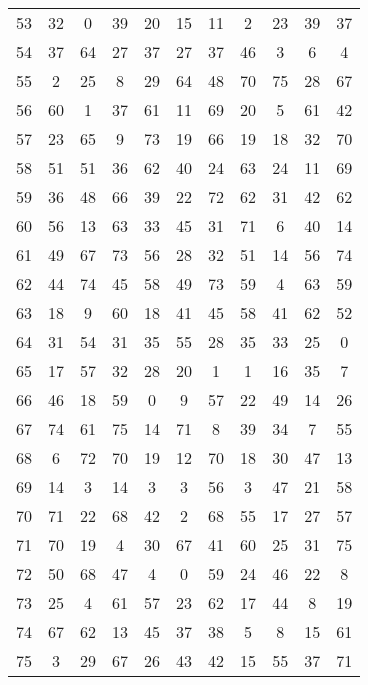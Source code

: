 \begin{table}
\begin{tabular}{c c c c c c c c c c c }
53 & 32 & 0 & 39 & 20 & 15 & 11 & 2 & 23 & 39 & 37 \\
54 & 37 & 64 & 27 & 37 & 27 & 37 & 46 & 3 & 6 & 4 \\
55 & 2 & 25 & 8 & 29 & 64 & 48 & 70 & 75 & 28 & 67 \\
56 & 60 & 1 & 37 & 61 & 11 & 69 & 20 & 5 & 61 & 42 \\
57 & 23 & 65 & 9 & 73 & 19 & 66 & 19 & 18 & 32 & 70 \\
58 & 51 & 51 & 36 & 62 & 40 & 24 & 63 & 24 & 11 & 69 \\
59 & 36 & 48 & 66 & 39 & 22 & 72 & 62 & 31 & 42 & 62 \\
60 & 56 & 13 & 63 & 33 & 45 & 31 & 71 & 6 & 40 & 14 \\
61 & 49 & 67 & 73 & 56 & 28 & 32 & 51 & 14 & 56 & 74 \\
62 & 44 & 74 & 45 & 58 & 49 & 73 & 59 & 4 & 63 & 59 \\
63 & 18 & 9 & 60 & 18 & 41 & 45 & 58 & 41 & 62 & 52 \\
64 & 31 & 54 & 31 & 35 & 55 & 28 & 35 & 33 & 25 & 0 \\
65 & 17 & 57 & 32 & 28 & 20 & 1 & 1 & 16 & 35 & 7 \\
66 & 46 & 18 & 59 & 0 & 9 & 57 & 22 & 49 & 14 & 26 \\
67 & 74 & 61 & 75 & 14 & 71 & 8 & 39 & 34 & 7 & 55 \\
68 & 6 & 72 & 70 & 19 & 12 & 70 & 18 & 30 & 47 & 13 \\
69 & 14 & 3 & 14 & 3 & 3 & 56 & 3 & 47 & 21 & 58 \\
70 & 71 & 22 & 68 & 42 & 2 & 68 & 55 & 17 & 27 & 57 \\
71 & 70 & 19 & 4 & 30 & 67 & 41 & 60 & 25 & 31 & 75 \\
72 & 50 & 68 & 47 & 4 & 0 & 59 & 24 & 46 & 22 & 8 \\
73 & 25 & 4 & 61 & 57 & 23 & 62 & 17 & 44 & 8 & 19 \\
74 & 67 & 62 & 13 & 45 & 37 & 38 & 5 & 8 & 15 & 61 \\
75 & 3 & 29 & 67 & 26 & 43 & 42 & 15 & 55 & 37 & 71 \\
\hline
\end{tabular}
\end{table}